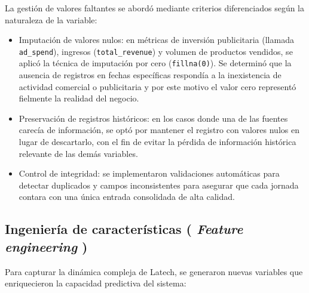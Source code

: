 La gestión de valores faltantes se abordó mediante criterios diferenciados según la naturaleza de la variable:
\begin{itemize}

    \item Imputación de valores nulos: en métricas de inversión publicitaria (llamada \texttt{ad\_spend}), ingresos (\texttt{total\_revenue}) y volumen de productos vendidos, se aplicó la técnica de imputación por cero (\texttt{fillna(0)}). Se determinó que la ausencia de registros en fechas específicas respondía a la inexistencia de actividad comercial o publicitaria y por este motivo el valor cero representó fielmente la realidad del negocio.
	\item Preservación de registros históricos: en los casos donde una de las fuentes carecía de información, se optó por mantener el registro con valores nulos en lugar de descartarlo, con el fin de evitar la pérdida de información histórica relevante de las demás variables.
	\item Control de integridad: se implementaron validaciones automáticas para detectar duplicados y campos inconsistentes para asegurar que cada jornada contara con una única entrada consolidada de alta calidad.
\end{itemize}


\subsection{Ingeniería de características ( \textit{Feature engineering} )}

Para capturar la dinámica compleja de Latech, se generaron nuevas variables que enriquecieron la capacidad predictiva del sistema:

